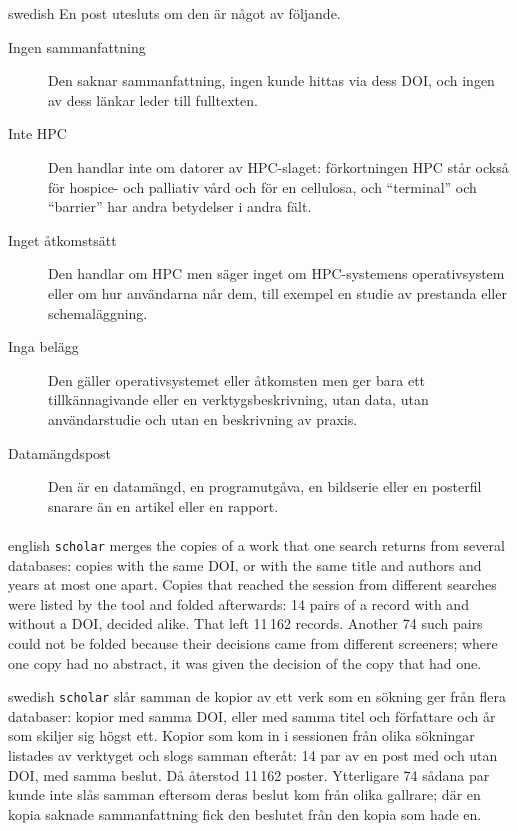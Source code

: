 \begin{onlyin}{swedish}
En post utesluts om den är något av följande.
\begin{description}
  \item[Ingen sammanfattning] Den saknar sammanfattning, ingen kunde
    hittas via dess DOI, och ingen av dess länkar leder till fulltexten.
  \item[Inte HPC] Den handlar inte om datorer av HPC-slaget:
    förkortningen HPC står också för hospice- och palliativ vård och för
    en cellulosa,
    och \enquote{terminal} och \enquote{barrier} har andra betydelser i
    andra fält.
  \item[Inget åtkomstsätt] Den handlar om HPC men säger inget om
    HPC-systemens operativsystem eller om hur användarna når dem, till
    exempel en studie av prestanda eller schemaläggning.
  \item[Inga belägg] Den gäller operativsystemet eller åtkomsten men ger
    bara ett tillkännagivande eller en verktygsbeskrivning, utan data,
    utan användarstudie och utan en beskrivning av praxis.
  \item[Datamängdspost] Den är en datamängd, en programutgåva, en
    bildserie eller en posterfil snarare än en artikel eller en rapport.
\end{description}
\end{onlyin}

\paragraph{} %
\begin{onlyin}{english} %
\texttt{scholar} merges the copies of a work that one search returns from
several databases: copies with the same DOI, or with the same title and
authors and years at most one apart.  Copies that reached the session
from different searches were listed by the tool and folded afterwards:
14 pairs of a record with and without a DOI, decided alike.  That left
11\,162 records.  Another 74 such pairs could not be folded because
their decisions came from different screeners; where one copy had no
abstract, it was given the decision of the copy that had one.
\end{onlyin}
\begin{onlyin}{swedish}
\texttt{scholar} slår samman de kopior av ett verk som en sökning ger
från flera databaser: kopior med samma DOI, eller med samma titel och
författare och år som skiljer sig högst ett.  Kopior som kom in i
sessionen från olika sökningar listades av verktyget och slogs samman
efteråt: 14 par av en post med och utan DOI, med samma beslut.  Då
återstod 11\,162 poster.  Ytterligare 74 sådana par kunde inte slås
samman eftersom deras beslut kom från olika gallrare; där en kopia
saknade sammanfattning fick den beslutet från den kopia som hade en.
\end{onlyin}

